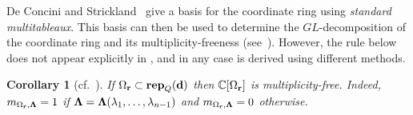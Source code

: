 \documentclass[12pt]{amsart}
\renewcommand{\d}{\mathbf{d}}
\DeclareMathOperator{\rep}{\mathbf{rep}}
\newtheorem{corollary}[theorem]{Corollary}
\theoremstyle{definition}
\theoremstyle{remark}
\begin{document}
De Concini and Strickland~\cite[Theorem~1.7]{Strickland} give a basis for the coordinate ring using \emph{standard multitableaux}. This basis can then be used to determine the $GL$-decomposition of the coordinate ring and its multiplicity-freeness (see~\cite[Remark p.~70]{Strickland}). However, the rule below does not appear explicitly in \cite{Strickland}, and in any case is derived using different methods.

\begin{corollary}[{cf.~\cite[Remark p.~70]{Strickland}}]\label{thm:complexesapp}
If $\Omega_{\bf r}\subset \rep_Q(\d)$ then $\mathbb{C}[\Omega_{\bf r}]$ is multiplicity-free. Indeed,
$m_{\Omega_{\bf r},{\bf \Lambda}}=1$ if ${\bf \Lambda}={\bf \Lambda}(\lambda_1,\ldots,\lambda_{n-1})$
and $m_{\Omega_{\bf r},{\bf \Lambda}}=0$ otherwise.
\end{corollary}
\end{document}
